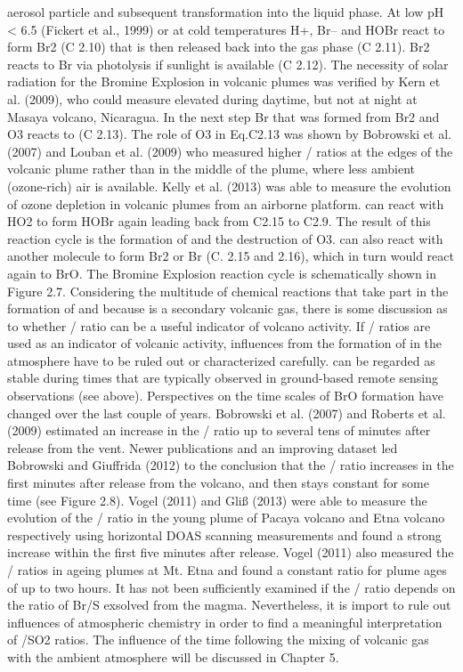 \documentclass  [
  paper    = a4,
  BCOR     = 10mm,
  twoside,
  fontsize = 12pt,
  fleqn,
  toc      = bibnumbered,
  toc      = listofnumbered,
  numbers  = noendperiod,
  headings = normal,
  listof   = leveldown,
  version  = 3.03
]                                       {scrreprt}
\begin{document}
	aerosol particle and subsequent transformation into the liquid phase. At low pH
	< 6.5 (Fickert et al., 1999) or at cold temperatures H+, Br– and HOBr react to
	form Br2 (C 2.10) that is then released back into the gas phase (C 2.11). Br2
	reacts to Br via photolysis if sunlight is available (C 2.12). The necessity of solar
	radiation for the Bromine Explosion in volcanic plumes was verified by Kern et al.
	(2009), who could measure elevated  during daytime, but not at night at
	Masaya volcano, Nicaragua. In the next step Br that was formed from Br2 and
	O3 reacts to  (C 2.13). The role of O3 in Eq.C2.13 was shown by Bobrowski
	et al. (2007) and Louban et al. (2009) who measured higher / ratios at
	the edges of the volcanic plume rather than in the middle of the plume, where
	less ambient (ozone-rich) air is available. Kelly et al. (2013) was able to measure
	the evolution of ozone depletion in volcanic plumes from an airborne platform.
	 can react with HO2 to form HOBr again leading back from C2.15 to C2.9.
	The result of this reaction cycle is the formation of  and the destruction of
	O3.  can also react with another  molecule to form Br2 or Br (C. 2.15
	and 2.16), which in turn would react again to BrO. The Bromine Explosion
	reaction cycle is schematically shown in Figure 2.7.
	Considering the multitude of chemical reactions that take part in the formation
	of  and because  is a secondary volcanic gas, there is some discussion as to
	whether / ratio can be a useful indicator of volcano activity. If / ratios are used as an indicator of volcanic activity, influences from the formation
	of  in the atmosphere have to be ruled out or characterized carefully.  can
	be regarded as stable during times that are typically observed in ground-based
	remote sensing observations (see above). Perspectives on the time scales of BrO
	formation have changed over the last couple of years. Bobrowski et al. (2007)
	and Roberts et al. (2009) estimated an increase in the / ratio up to
	several tens of minutes after release from the vent. Newer publications and an
	improving dataset led Bobrowski and Giuffrida (2012) to the conclusion that the
	/ ratio increases in the first minutes after release from the volcano, and
	then stays constant for some time (see Figure 2.8). Vogel (2011) and Gliß (2013)
	were able to measure the evolution of the / ratio in the young plume of
	Pacaya volcano and Etna volcano respectively using horizontal DOAS scanning
	measurements and found a strong increase within the first five minutes after
	release. Vogel (2011) also measured the / ratios in ageing plumes at Mt.
	Etna and found a constant ratio for plume ages of up to two hours. It has not
	been sufficiently examined if the / ratio depends on the ratio of Br/S
	exsolved from the magma. Nevertheless, it is import to rule out influences of
	atmospheric chemistry in order to find a meaningful interpretation of /SO2
	ratios. The influence of the time following the mixing of volcanic gas with the
	ambient atmosphere will be discussed in Chapter 5.
\end{document}
